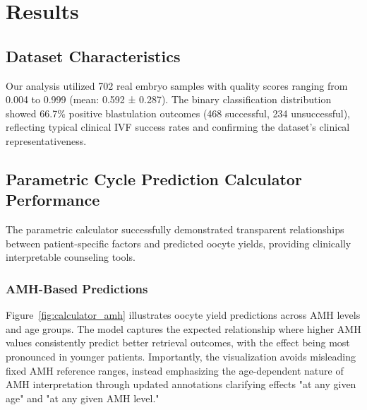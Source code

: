 \section{Results}\label{sec:results}

\subsection{Dataset Characteristics}

Our analysis utilized 702 real embryo samples with quality scores ranging from 0.004 to 0.999 (mean: 0.592 ± 0.287). The binary classification distribution showed 66.7\% positive blastulation outcomes (468 successful, 234 unsuccessful), reflecting typical clinical IVF success rates and confirming the dataset's clinical representativeness.

\subsection{Parametric Cycle Prediction Calculator Performance}

The parametric calculator successfully demonstrated transparent relationships between patient-specific factors and predicted oocyte yields, providing clinically interpretable counseling tools.

\subsubsection{AMH-Based Predictions}

Figure~\ref{fig:calculator_amh} illustrates oocyte yield predictions across AMH levels and age groups. The model captures the expected relationship where higher AMH values consistently predict better retrieval outcomes, with the effect being most pronounced in younger patients. Importantly, the visualization avoids misleading fixed AMH reference ranges, instead emphasizing the age-dependent nature of AMH interpretation through updated annotations clarifying effects "at any given age" and "at any given AMH level."

